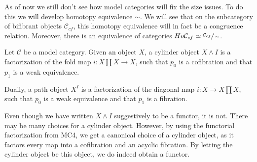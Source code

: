 \documentclass[../thesis.tex]{subfiles}
\begin{document}
            As of now we still don't see how model categories will fix the size issues. To do this we will develop homotopy equivalence $\sim$. We will see that on the subcategory of bifibrant objects $\mathcal{C}_{cf}$, this homotopy equivalence will in fact be a congruence relation. Moreover, there is an equivalence of categories $Ho\mathcal{C}_{cf}\simeq \sfrac{\mathcal{C}_{cf}}{\sim}$.

            \begin{definition}
                Let $\mathcal{C}$ be a model category. Given an object $X$, a cylinder object $X\wedge I$ is a factorization of the fold map $i:X\coprod X \rightarrow X$, such that $p_0$ is a cofibration and that $p_1$ is a weak equivalence. 
                
                \begin{center}
                \end{center}

                Dually, a path object  $X^{I}$ is a factorization of the diagonal map $i: X \rightarrow X\prod X$, such that $p_0$ is a weak equivalence and that $p_1$ is a fibration.
                
                \begin{center}
                \end{center}
            \end{definition}

            \begin{remark}
                Even though we have written $X\wedge I$ suggestively to be a functor, it is not. There may be many choices for a cylinder object. However, by using the functorial factorization from MC4, we get a canonical choice of a cylinder object, as it factors every map into a cofibration and an acyclic fibration. By letting the cylinder object be this object, we do indeed obtain a functor.
            \end{remark}
\end{document}
